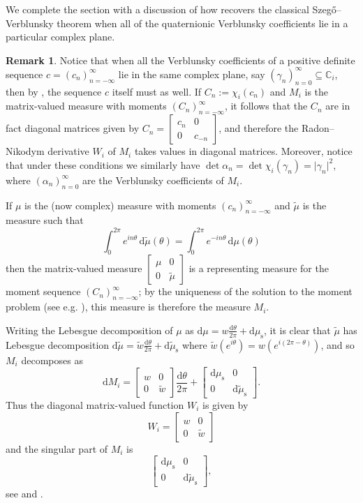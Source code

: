 \documentclass[11pt,reqno]{amsart}
\def\a{\alpha}
\def\x{\chi}
\def\g{\gamma}
\def\th{\theta}
\def\rmd{\mathrm{d}}
\def\CC{\mathbb{C}}
\def\rms{\mathrm{s}}
\theoremstyle{definition}
\newtheorem{remark}[theorem]{Remark}
\numberwithin{equation}{section}
\renewcommand{\tilde}{\widetilde}
\begin{document}
We complete the section with a discussion of how  recovers the classical Szeg\H{o}--Verblunsky theorem when all of the quaternionic Verblunsky coefficients lie in a particular complex plane.

\begin{remark}
    Notice that when all the Verblunsky coefficients of a positive definite sequence \(c = (c_n)_{n=-\infty}^{\infty}\) lie in the same complex plane, say \((\g_n)_{n=0}^{\infty} \subseteq \CC_i\), then by , the sequence \(c\) itself must as well. If \(C_n := \x_i(c_n)\) and \(M_i\) is the matrix-valued measure with moments \((C_n)_{n=-\infty}^{\infty}\), it follows that the \(C_n\) are in fact diagonal matrices given by \(C_n = \begin{bmatrix} c_n & 0 \\ 0 & c_{-n} \end{bmatrix}\), and therefore the Radon--Nikodym derivative \(W_i\) of \(M_i\) takes values in diagonal matrices. Moreover, notice that under these conditions we similarly have \(\det \a_n = \det \x_i(\g_n) = \lvert \g_n \rvert^2\), where \((\a_n)_{n=0}^{\infty}\) are the Verblunsky coefficients of \(M_i\).

	If \(\mu\) is the (now complex) measure with moments \((c_n)_{n=-\infty}^{\infty}\) and \(\tilde{\mu}\) is the measure such that
	\[
		\int_0^{2\pi} e^{in\th} \, \rmd \tilde{\mu}(\th) = \int_0^{2\pi} e^{-in\th} \, \rmd\mu(\th)
	\]
	then the matrix-valued measure \(\begin{bmatrix} \mu & 0 \\ 0 & \tilde{\mu} \end{bmatrix}\) is a representing measure for the moment sequence \((C_n)_{n=-\infty}^{\infty}\); by the uniqueness of the solution to the moment problem (see e.g. \cite[Theorem 1]{DGK78}), this measure is therefore the measure \(M_i\).

	Writing the Lebesgue decomposition of \(\mu\) as \(\rmd \mu = w \frac{\rmd\th}{2\pi} + \rmd \mu_\rms\), it is clear that \(\tilde{\mu}\) has Lebesgue decomposition \(\rmd\tilde{\mu} = \tilde{w} \frac{\rmd\th}{2\pi} + \rmd\tilde{\mu}_\rms\) where \(\tilde{w}(e^{i\th}) = w(e^{i(2\pi - \th)})\), and so \(M_i\) decomposes as
	\[
		\rmd M_i = \begin{bmatrix} w & 0 \\ 0 & \tilde{w} \end{bmatrix} \frac{\rmd\th}{2\pi} + \begin{bmatrix} \rmd \mu_\rms & 0 \\ 0 & \rmd \tilde{\mu}_\rms \end{bmatrix}.
	\]
	Thus the diagonal matrix-valued function \(W_i\) is given by
	\[
		W_i = \begin{bmatrix}w & 0 \\ 0 & \tilde{w}\end{bmatrix}
	\]
    and the singular part of \(M_i\) is
    \[
        \begin{bmatrix} \rmd \mu_\rms & 0 \\ 0 & \rmd \tilde{\mu}_\rms \end{bmatrix},
    \]
    see \cite[Section 2]{DGK78} and \cite[pg. 4]{Hof62}.
    

\end{remark}
\end{document}
